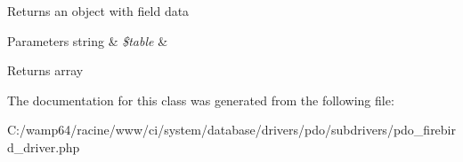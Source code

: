 Returns an object with field data


\begin{DoxyParams}[1]{Parameters}
string & {\em \$table} & \\
\hline
\end{DoxyParams}
\begin{DoxyReturn}{Returns}
array 
\end{DoxyReturn}


The documentation for this class was generated from the following file\+:\begin{DoxyCompactItemize}
\item 
C\+:/wamp64/racine/www/ci/system/database/drivers/pdo/subdrivers/pdo\+\_\+firebird\+\_\+driver.\+php\end{DoxyCompactItemize}
